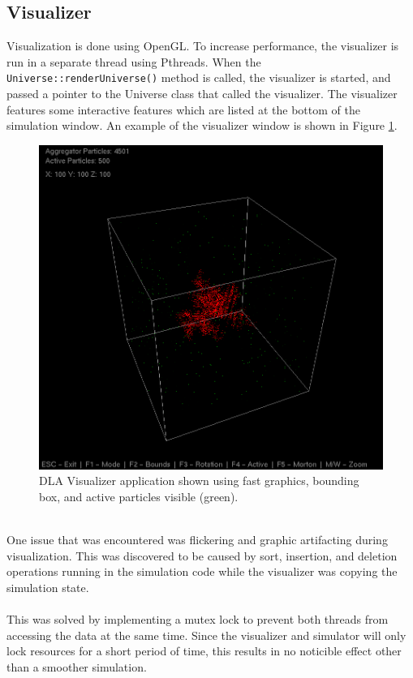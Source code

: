 \documentclass[fleqn,10pt]{UserGuideArx} %
\begin{document}
\subsection{Visualizer}
Visualization is done using OpenGL. To increase performance, the visualizer is run in a separate thread using Pthreads. When the \texttt{Universe\allowbreak::renderUniverse()} method is called, the visualizer is started, and passed a pointer to the Universe class that called the visualizer. The visualizer features some interactive features which are listed at the bottom of the simulation window. An example of the visualizer window is shown in Figure \ref{fig:DLAAPP}.
\begin{figure}[!h]\centering %
    \includegraphics[width=\linewidth]{images/DLAVisualizer.png}
    \caption{DLA Visualizer application shown using fast graphics, bounding box, and active particles visible (green).}
    \label{fig:DLAAPP}
    \end{figure}

~\\
One issue that was encountered was flickering and graphic artifacting during visualization. This was discovered to be caused by sort, insertion, and deletion operations running in the simulation code while the visualizer was copying the simulation state.\\~\\
This was solved by implementing a mutex lock to prevent both threads from accessing the data at the same time. Since the visualizer and simulator will only lock resources for a short period of time, this results in no noticible effect other than a smoother simulation.\\
\end{document}
